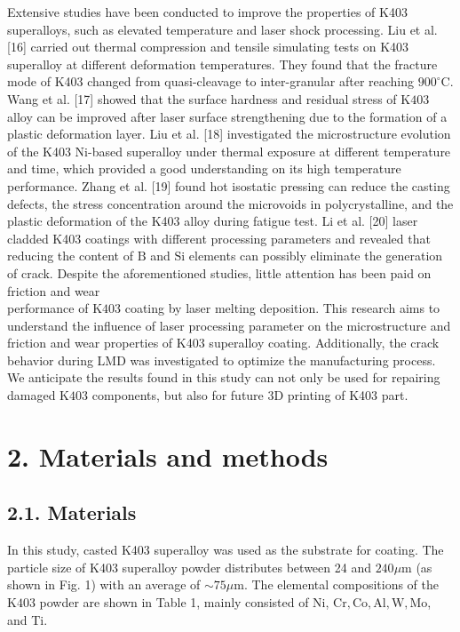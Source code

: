 \documentclass[10pt]{article}
\begin{document}
Extensive studies have been conducted to improve the properties of K403 superalloys, such as elevated temperature and laser shock processing. Liu et al. [16] carried out thermal compression and tensile simulating tests on K403 superalloy at different deformation temperatures. They found that the fracture mode of K403 changed from quasi-cleavage to inter-granular after reaching $900^{\circ} \mathrm{C}$. Wang et al. [17] showed that the surface hardness and residual stress of $\mathrm{K} 403$ alloy can be improved after laser surface strengthening due to the formation of a plastic deformation layer. Liu et al. [18] investigated the microstructure evolution of the K403 $\mathrm{Ni}$-based superalloy under thermal exposure at different temperature and time, which provided a good understanding on its high temperature performance. Zhang et al. [19] found hot isostatic pressing can reduce the casting defects, the stress concentration around the microvoids in polycrystalline, and the plastic deformation of the K403 alloy during fatigue test. Li et al. [20] laser cladded K403 coatings with different processing parameters and revealed that reducing the content of $\mathrm{B}$ and $\mathrm{Si}$ elements can possibly eliminate the generation of crack. Despite the aforementioned studies, little attention has been paid on friction and wear\\
performance of $\mathrm{K} 403$ coating by laser melting deposition. This research aims to understand the influence of laser processing parameter on the microstructure and friction and wear properties of K403 superalloy coating. Additionally, the crack behavior during LMD was investigated to optimize the manufacturing process. We anticipate the results found in this study can not only be used for repairing damaged $\mathrm{K} 403$ components, but also for future 3D printing of K403 part.

\section*{2. Materials and methods}
\subsection*{2.1. Materials}
In this study, casted K403 superalloy was used as the substrate for coating. The particle size of K403 superalloy powder distributes between 24 and $240 \mu \mathrm{m}$ (as shown in Fig. 1) with an average of $\sim 75 \mu \mathrm{m}$. The elemental compositions of the $\mathrm{K} 403$ powder are shown in Table 1, mainly consisted of Ni, $\mathrm{Cr}, \mathrm{Co}, \mathrm{Al}, \mathrm{W}, \mathrm{Mo}$, and Ti.
\end{document}
